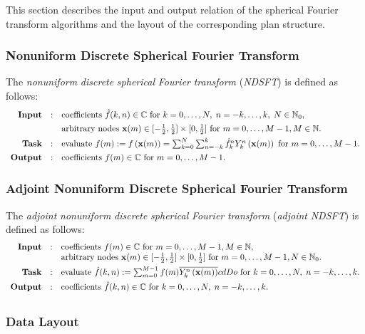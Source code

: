 This section describes the input and output relation of the spherical Fourier transform algorithms and the layout of the corresponding plan structure.\hypertarget{group__nfsft_ndsft}{}\subsubsection{Nonuniform Discrete Spherical Fourier Transform}\label{group__nfsft_ndsft}
The {\itshape nonuniform} {\itshape discrete} {\itshape spherical} {\itshape Fourier} {\itshape transform} ({\itshape N\-D\-S\-F\-T}) is defined as follows\-: \[ \begin{array}{rcl} \text{\textbf{Input}} & : & \text{coefficients } \hat{f}(k,n) \in \mathbb{C} \text{ for } k=0,\ldots,N,\;n=-k, \ldots,k,\; N \in \mathbb{N}_0,\\[1ex] & & \text{arbitrary nodes } \mathbf{x}(m) \in [-\frac{1}{2},\frac{1}{2}] \times [0,\frac{1}{2}] \text{ for } m=0,\ldots,M-1, M \in \mathbb{N}. \\[1ex] \text{\textbf{Task}} & : & \text{evaluate } f(m) := f\left( \mathbf{x}(m)\right) = \sum_{k=0}^N \sum_{n=-k}^k \hat{f}_k^n Y_k^n\left(\mathbf{x}(m)\right) \text{ for } m=0,\ldots,M-1. \\[1ex] \text{\textbf{Output}} & : & \text{coefficients } f(m) \in \mathbb{C} \text{ for } m=0,\ldots,M-1.\\ \end{array} \]\hypertarget{group__nfsft_andsft}{}\subsubsection{Adjoint Nonuniform Discrete Spherical Fourier Transform}\label{group__nfsft_andsft}
The {\itshape adjoint} {\itshape nonuniform} {\itshape discrete} {\itshape spherical} {\itshape Fourier} {\itshape transform} ({\itshape adjoint} {\itshape N\-D\-S\-F\-T}) is defined as follows\-: \[ \begin{array}{rcl} \text{\textbf{Input}} & : & \text{coefficients } f(m) \in \mathbb{C} \text{ for } m=0,\ldots,M-1, M \in \mathbb{N},\\ & & \text{arbitrary nodes } \mathbf{x}(m) \in [-\frac{1}{2},\frac{1}{2}] \times [0,\frac{1}{2}] \text{ for } m=0,\ldots,M-1, N \in \mathbb{N}_0.\\[1ex] \text{\textbf{Task}} & : & \text{evaluate } \hat{f}(k,n) := \sum_{m=0}^{M-1} f(m) \overline{Y_k^n\left(\mathbf{x}(m)\right)}cd Do \text{ for } k=0,\ldots,N,\;n=-k,\ldots,k.\\[1ex] \text{\textbf{Output}} & : & \text{coefficients } \hat{f}(k,n) \in \mathbb{C} \text{ for } k=0,\ldots,N,\;n=-k,\ldots,k.\\[1ex] \end{array} \]\hypertarget{group__nfsft_dl}{}\subsubsection{Data Layout}\label{group__nfsft_dl}
